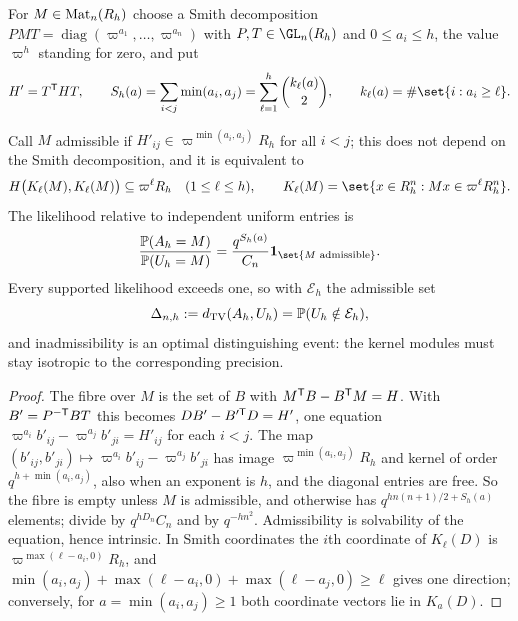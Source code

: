 For $M\in\operatorname{Mat}_n(R_h)$ choose a Smith decomposition $PMT=\operatorname{diag}(\varpi^{a_1},\dots,\varpi^{a_n})$
with $P,T\in\GL_n(R_h)$ and $0\le a_i\le h$, the value $\varpi^h$ standing for zero, and put
\[
 H'=T^{\spnT}HT,\qquad S_h(a)=\sum_{i<j}\min(a_i,a_j)=\sum_{\ell=1}^h\binom{k_\ell(a)}2,\qquad
 k_\ell(a)=\#\set{i:a_i\ge\ell}.
\]

\begin{theorem}\label{spn:thm:local-density}
Call $M$ admissible if $H'_{ij}\in\varpi^{\min(a_i,a_j)}R_h$ for all $i<j$; this does not depend on the
Smith decomposition, and it is equivalent to
\[
 H\bigl(K_\ell(M),K_\ell(M)\bigr)\subseteq\varpi^\ell R_h\quad(1\le\ell\le h),\qquad
 K_\ell(M)=\set{x\in R_h^n:Mx\in\varpi^\ell R_h^n}.
\]
The likelihood relative to independent uniform entries is
\[
 \frac{\spnP(A_h=M)}{\spnP(U_h=M)}=\frac{q^{S_h(a)}}{C_n}\mathbf 1_{\set{M\text{ admissible}}}.
\] Every supported
likelihood exceeds one, so with $\mathcal E_h$ the admissible set
\begin{equation}\label{spn:eq:local-support-tv}
 \Delta_{n,h}:=d_{\mathrm{TV}}(A_h,U_h)=\mathbb{P}(U_h\notin\mathcal E_h),
\end{equation}
and inadmissibility is an optimal distinguishing event: the kernel modules must stay isotropic to
the corresponding precision.
\end{theorem}
\begin{proof}
The fibre over $M$ is the set of $B$ with $M^{\mathsf{T}}B-B^{\mathsf{T}}M=H$. With $B'=P^{-\mathsf{T}}BT$ this becomes
$DB'-B'^{\mathsf{T}}D=H'$, one equation $\varpi^{a_i}b'_{ij}-\varpi^{a_j}b'_{ji}=H'_{ij}$ for each $i<j$. The
map $(b'_{ij},b'_{ji})\mapsto\varpi^{a_i}b'_{ij}-\varpi^{a_j}b'_{ji}$ has image $\varpi^{\min(a_i,a_j)}R_h$
and kernel of order $q^{h+\min(a_i,a_j)}$, also when an exponent is $h$, and the diagonal entries are
free. So the fibre is empty unless $M$ is admissible, and otherwise has $q^{hn(n+1)/2+S_h(a)}$
elements; divide by $q^{hD_n}C_n$ and by $q^{-hn^2}$. Admissibility is solvability of the equation,
hence intrinsic. In Smith coordinates the $i$th coordinate of $K_\ell(D)$ is
$\varpi^{\max(\ell-a_i,0)}R_h$, and $\min(a_i,a_j)+\max(\ell-a_i,0)+\max(\ell-a_j,0)\ge\ell$ gives one
direction; conversely, for $a=\min(a_i,a_j)\ge1$ both coordinate vectors lie in $K_a(D)$.
\end{proof}

